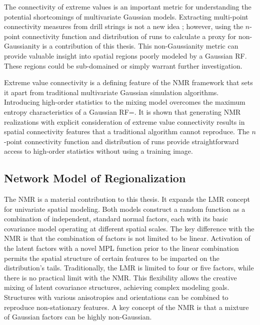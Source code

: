 The connectivity of extreme values is an important metric for understanding the potential shortcomings of multivariate Gaussian models. Extracting multi-point connectivity measures from drill strings is not a new idea \citep{ortiz2003characterization,boisvert2007multiplepoint}; however, using the $n$-point connectivity function and distribution of runs to calculate a proxy for non-Gaussianity is a contribution of this thesis. This non-Gaussianity metric can provide valuable insight into spatial regions poorly modeled by a Gaussian \gls{RF}. These regions could be sub-domained or simply warrant further investigation.

Extreme value connectivity is a defining feature of the \gls{NMR} framework that sets it apart from traditional multivariate Gaussian simulation algorithms. Introducing high-order statistics to the mixing model overcomes the maximum entropy characteristics of a Gaussian \gls{RF}=. It is shown that generating \gls{NMR} realizations with explicit consideration of extreme value connectivity results in spatial connectivity features that a traditional algorithm cannot reproduce. The $n$-point connectivity function and distribution of runs provide straightforward access to high-order statistics without using a training image.

\subsection{Network Model of Regionalization}
\label{subsec:07nmr}

The \gls{NMR} is a material contribution to this thesis. It expands the \gls{LMR} concept for univariate spatial modeling. Both models construct a random function as a combination of independent, standard normal factors, each with its basic covariance model operating at different spatial scales. The key difference with the \gls{NMR} is that the combination of factors is not limited to be linear. Activation of the latent factors with a novel \gls{MPL} function prior to the linear combination permits the spatial structure of certain features to be imparted on the distribution's tails. Traditionally, the \gls{LMR} is limited to four or five factors, while there is no practical limit with the \gls{NMR}. This flexibility allows the creative mixing of latent covariance structures, achieving complex modeling goals. Structures with various anisotropies and orientations can be combined to reproduce non-stationary features. A key concept of the \gls{NMR} is that a mixture of Gaussian factors can be highly non-Gaussian.

